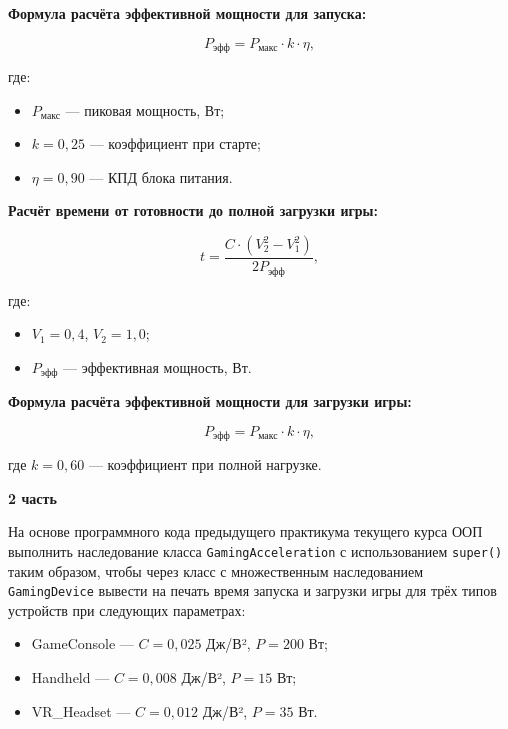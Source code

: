 \begin{enumerate}
\textbf{Формула расчёта эффективной мощности для запуска:}

\begin{equation}
P_{\text{эфф}} = P_{\text{макс}} \cdot k \cdot \eta,
\end{equation}

где:  
\begin{itemize}
    \item $P_{\text{макс}}$ — пиковая мощность, Вт;  
    \item $k = 0{,}25$ — коэффициент при старте;  
    \item $\eta = 0{,}90$ — КПД блока питания.  
\end{itemize}

\textbf{Расчёт времени от готовности до полной загрузки игры:}

\begin{equation}
t = \frac{C \cdot (V_2^2 - V_1^2)}{2P_{\text{эфф}}},
\end{equation}

где:  
\begin{itemize}
    \item $V_1 = 0{,}4$, $V_2 = 1{,}0$;  
    \item $P_{\text{эфф}}$ — эффективная мощность, Вт.  
\end{itemize}

\textbf{Формула расчёта эффективной мощности для загрузки игры:}

\begin{equation}
P_{\text{эфф}} = P_{\text{макс}} \cdot k \cdot \eta,
\end{equation}

где $k = 0{,}60$ — коэффициент при полной нагрузке.

\textbf{2 часть}

На основе программного кода предыдущего практикума текущего курса ООП выполнить наследование класса \texttt{GamingAcceleration} с использованием \texttt{super()} таким образом, чтобы через класс с множественным наследованием \texttt{GamingDevice} вывести на печать время запуска и загрузки игры для трёх типов устройств при следующих параметрах:

\begin{itemize}
    \item GameConsole — $C = 0{,}025$ Дж/В², $P = 200$ Вт;  
    \item Handheld — $C = 0{,}008$ Дж/В², $P = 15$ Вт;  
    \item VR\_Headset — $C = 0{,}012$ Дж/В², $P = 35$ Вт.  
\end{itemize}


\end{enumerate}
